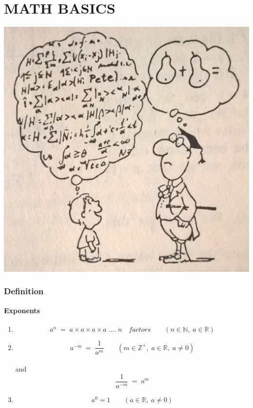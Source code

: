 
\pagestyle{plain} %

\part*{MATH BASICS}
\null \vspace{4cm}
\begin{minipage}{\linewidth}
\centering
\includegraphics[scale=0.25]{./image/Math/doubts.jpg}
\end{minipage}

\newpage
\section{Definition}
\Large
\subsection{Exponents}
\begin{enumerate}
\item 
\[a^n \; = \; a \times a \times a \times a \; .... \; n \quad factors \qquad (n \in \mathbb{N}, \; a \in \mathbb{R})\]
\item 
\[a^{-m} \; = \; \frac{1}{a^m} \qquad (m \in \mathbb{Z^+}, \; a \in \mathbb{R}, \; a \neq 0)\] \\
and \\
\[\frac{1}{a^{-m}} \; = \; a^m\]
\item 
\[a^0=1 \qquad (a \in \mathbb{R}, \; a \neq 0)\]
\end{enumerate}
